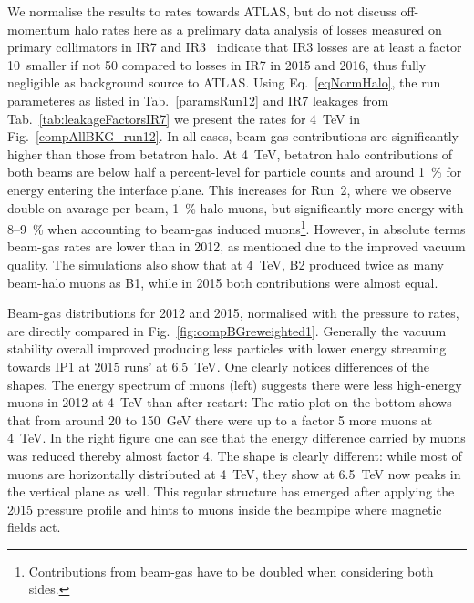We normalise the results to rates towards ATLAS, but do not discuss off-momentum halo rates here as a prelimary data analysis of losses measured on primary collimators in IR7 and IR3~\cite{belenOffMom} indicate that IR3 losses are at least a factor 10~smaller if not 50 compared to losses in IR7 in 2015 and 2016, thus fully negligible as background source to ATLAS. Using Eq.~\ref{eqNormHalo}, the run parameteres as listed in Tab.~\ref{paramsRun12} and IR7 leakages from Tab.~\ref{tab:leakageFactorsIR7} we present the rates for 4~TeV in Fig.~\ref{compAllBKG_run12}. In all cases, beam-gas contributions are significantly higher than those from betatron halo. At 4~TeV, betatron halo contributions of both beams are below half a percent-level for particle counts and around 1~\% for energy entering the interface plane. This increases for Run~2, where we observe double on avarage per beam, 1~\% halo-muons, but significantly more energy with 8--9~\% when accounting to beam-gas induced muons\footnote{Contributions from beam-gas have to be doubled when considering both sides.}. However, in absolute terms beam-gas rates are lower than in 2012, as mentioned due to the improved vacuum quality. The simulations also show that at 4~TeV, B2 produced twice as many beam-halo muons as B1, while in 2015 both contributions were almost equal. 

Beam-gas distributions for 2012 and 2015, normalised with the pressure to rates, are directly compared in Fig.~\ref{fig:compBGreweighted1}. Generally the vacuum stability overall improved producing less particles with lower energy streaming towards IP1 at 2015 runs' at 6.5~TeV. One clearly notices differences of the shapes. The energy spectrum of muons (left) suggests there were less high-energy muons in 2012 at 4~TeV than after restart: The ratio plot on the bottom shows that from around 20 to 150~GeV there were up to a factor 5 more muons at 4~TeV. In the right figure one can see that the energy difference carried by muons was reduced thereby almost factor 4. The shape is clearly different: while most of muons are horizontally distributed at 4~TeV, they show at 6.5~TeV now peaks in the vertical plane as well. This regular structure has emerged after applying the 2015 pressure profile and hints to muons inside the beampipe where magnetic fields act.

